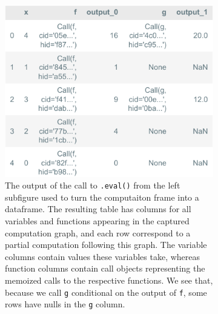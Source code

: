 \documentclass{article} %
\begin{document}
\begin{figure}[htbp]
\begin{minipage}[b]{0.48\textwidth}
        \begin{subfigure}[b]{\textwidth}
            \centering
            \includegraphics[width=\textwidth]{img/fig5.pdf}
            \caption{The output of the call to \texttt{.eval()} from the left
            subfigure used to turn the computaiton frame into a dataframe. The
            resulting table has columns for all variables and functions
            appearing in the captured computation graph, and each row correspond
            to a partial computation following this graph. The variable columns
            contain values these variables take, whereas function columns
            contain call objects representing the memoized calls to the
            respective functions. We see that, because we call \texttt{g}
            conditional on the output of \texttt{f}, some rows have nulls in the
            \texttt{g} column.}
            \label{fig:figure2}
        \end{subfigure}
    \end{minipage}
    \hfill
    \begin{minipage}[b]{0.45\textwidth}
        \begin{subfigure}[b]{\textwidth}
            \centering

\end{subfigure}
\end{minipage}
\end{figure}
\end{document}
